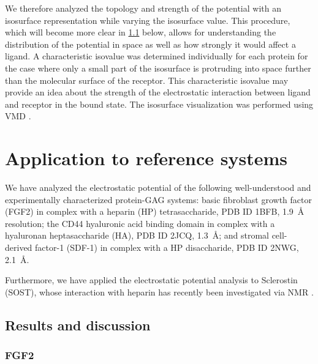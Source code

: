 We therefore analyzed the topology and strength of the potential with an
isosurface representation while varying the isosurface value. This procedure,
which will become more clear in \cref{bspred:appl_discussion} below, allows for
understanding the distribution of the potential in space as well as how strongly
it would affect a ligand. A characteristic isovalue was determined individually
for each protein for the case where only a small part of the isosurface is
protruding into space further than the molecular surface of the receptor. This
characteristic isovalue may provide an idea about the strength of the
electrostatic interaction between ligand and receptor in the bound state. The
isosurface visualization was performed using VMD \cite{vmd_1996}.


\section{Application to reference systems}
\label{bspred:application}

We have analyzed the electrostatic potential of the following well-understood
and experimentally characterized protein-GAG systems: basic fibroblast growth
factor (FGF2) in complex with a heparin (HP) tetrasaccharide, PDB ID 1BFB,
\SI{1.9}{\angstrom} resolution; the CD44 hyaluronic acid binding domain in
complex with a hyaluronan heptasaccharide (HA), PDB ID 2JCQ,
\SI{1.3}{\angstrom}; and stromal cell-derived factor-1 (SDF-1) in complex with a
HP disaccharide, PDB ID 2NWG, \SI{2.1}{\angstrom}.

Furthermore, we have applied the electrostatic potential analysis to Sclerostin
(SOST), whose interaction with heparin has recently been investigated via NMR
\cite{sost_heparin_2009}.


\subsection{Results and discussion}
\label{bspred:appl_discussion}

\subsubsection{FGF2}

